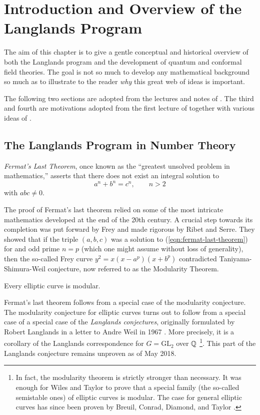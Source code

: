 \chapter{Introduction and Overview of the Langlands Program\label{ch:intro}}

The aim of this chapter is to give a gentle conceptual and historical overview of both the Langlands program and the development of quantum and conformal field theories. The goal is not so much to develop any mathematical background so much as to illustrate to the reader \emph{why} this great web of ideas is important.

The following two sections are adopted from the lectures and notes of \cite{Yoo18}. The third and fourth are motivations adopted from the first lecture of \cite{Yoo17} together with various ideas of \cite{Yoo18}.

\section{The Langlands Program in Number Theory} %
\label{sec:the_langlands_program_in_number_theory}

\emph{Fermat's Last Theorem}, once known as the ``greatest unsolved problem in mathematics,'' asserts that there does not exist an integral solution to
\begin{equation}
\label{eqn:fermat-last-theorem}
a^n + b^n = c^n, \qquad n > 2
\end{equation}
with $abc\neq 0$. 

The proof of Fermat's last theorem relied on some of the most intricate mathematics developed at the end of the 20th century. A crucial step towards its completion was put forward by Frey and made rigorous by Ribet and Serre. They showed that if the triple $(a,b,c)$ was a solution to (\ref{eqn:fermat-last-theorem}) for and odd prime $n=p$ (which one might assume without loss of generality), then the so-called Frey curve $y^2=x(x-a^p)(x+b^p)$ contradicted Taniyama-Shimura-Weil conjecture, now referred to as the Modularity Theorem. 
\begin{theorem}
\label{thm:modularity-theorem}
	Every elliptic curve is modular.
\end{theorem}

Fermat's last theorem follows from a special case of the modularity conjecture. The modularity conjecture for elliptic curves turns out to follow from a special case of a special case of the \emph{Langlands conjectures}, originally formulated by Robert Langlands in a letter to Andre Weil in 1967 \cite{langlands1967}.
More precisely, it is a corollary of the Langlands correspondence for $G = \mathrm{GL}_2$ over $\mathbb{Q}$ \footnote{In fact, the modularity theorem is strictly stronger than necessary. It was enough for Wiles and Taylor to prove that a special family (the so-called semistable ones) of elliptic curves is modular. The case for general elliptic curves has since been proven by Breuil, Conrad, Diamond, and Taylor \cite{breuil2001}.}. This part of the Langlands conjecture remains unproven as of May 2018. 

